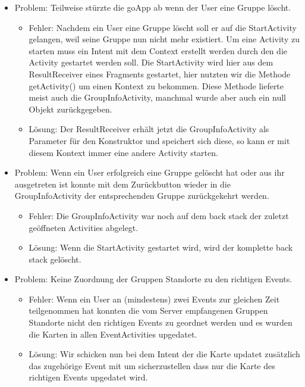 \documentclass{scrartcl}
\begin{document}
		\begin{itemize}
			\item Problem: Teilweise stürzte die goApp ab wenn der User eine Gruppe löscht.
			\begin{itemize}
				\item Fehler: Nachdem ein User eine Gruppe löscht soll er auf die StartActivity gelangen, weil seine Gruppe nun nicht mehr existiert. Um eine Activity zu starten muss ein Intent mit dem Context erstellt werden durch den die  Activity gestartet werden soll. Die StartActivity wird hier aus dem ResultReceiver eines Fragments gestartet, hier nutzten wir die Methode getActivity() um einen Kontext zu bekommen. Diese Methode lieferte meist auch die GroupInfoActivity, manchmal wurde aber auch ein null Objekt zurückgegeben.
				\item Lösung: Der ResultReceiver erhält jetzt die GroupInfoActivity als Parameter für den Konstruktor und speichert sich diese, so kann er mit diesem Kontext immer eine andere Activity starten.
			\end{itemize}

			\item Problem: Wenn ein User erfolgreich eine Gruppe gelöscht hat oder aus ihr ausgetreten ist konnte mit dem Zurückbutton wieder in die GroupInfoActivity der entsprechenden Gruppe zurückgekehrt werden.
			\begin{itemize}
				\item Fehler: Die GroupInfoActivity war noch auf dem back stack der zuletzt geöffneten Activities abgelegt. 
				\item Lösung: Wenn die StartActivity gestartet wird, wird der komplette back stack gelöscht.
			\end{itemize}

			\item Problem: Keine Zuordnung der Gruppen Standorte zu den richtigen Events.
			\begin{itemize}
				\item Fehler: Wenn ein User an (mindestens) zwei Events zur gleichen Zeit teilgenommen hat konnten die vom Server empfangenen Gruppen Standorte nicht den richtigen Events zu geordnet werden und es wurden die Karten in allen EventActivities upgedatet.
				\item Lösung: Wir schicken nun bei dem Intent der die Karte updatet zusätzlich das zugehörige Event mit um sicherzustellen dass nur die Karte des richtigen Events upgedatet wird.
			\end{itemize}

			
		\end{itemize}
	
\end{document}

